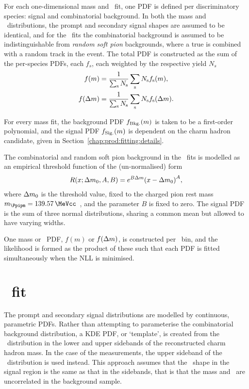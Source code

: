 For each one-dimensional mass and \deltam\ fit, one PDF is defined per 
discriminatory species: signal and combinatorial background.
In both the mass and \deltam\ distributions, the prompt and secondary signal 
shapes are assumed to be identical, and for the \deltam\ fits the combinatorial 
background is assumed to be indistinguishable from \emph{random soft pion} 
backgrounds, where a true \PDzero is combined with a random track in the event.
The total \ac{PDF} is constructed as the sum of the per-species \acp{PDF}, each $f_{s}$, 
each weighted by the respective yield $N_{s}$
\begin{align}
  f(m) &= \frac{1}{\sum_{\textnormal{s}} N_{\textnormal{s}}}
          \sum_{\textnormal{s}} N_{\textnormal{s}}
          f_{\textnormal{s}}(m),\\
  f(\Delta{m}) &= \frac{1}{\sum_{\textnormal{s}} N_{\textnormal{s}}}
                \sum_{\textnormal{s}} N_{\textnormal{s}}
                f_{\textnormal{s}}(\Delta{m}).
\end{align}

For every mass fit, the background PDF $f_{\textnormal{Bkg.}}(m)$ is taken to 
be a first-order polynomial, and the signal PDF $f_{\textnormal{Sig.}}(m)$ is 
dependent on the charm hadron candidate, given in 
Section~\ref{chap:prod:fitting:details}.

The combinatorial and random soft pion background in the \deltam\ fits is 
modelled as an empirical threshold function of the (un-normalised) form
\begin{equation}
  R(x; \Delta{m}_{0}, A, B) = e^{B\Delta{m}}
    {(x - \Delta{m}_{0})}^A,
\end{equation}
where $\Delta{m}_{0}$ is the threshold value, fixed to the charged pion rest mass 
$m_{\Ppipm} = \SI{139.57}{\MeVcc}$~\cite{PDG2014}, and the parameter $B$ is 
fixed to zero.
The signal PDF is the sum of three normal distributions, sharing a common mean 
but allowed to have varying widths.

One mass or \deltam\ PDF, $f(m)$ or $f(\Delta{m})$, is constructed per \pTy\ bin, 
and the likelihood is formed as the product of these such that each PDF is 
fitted simultaneously when the \ac{NLL} is minimised.

\section{\lnipchisq\ fit}
\label{chap:prod:fitting:ipchisq}

The prompt and secondary signal distributions are modelled by continuous, 
parametric \acp{PDF}.
Rather than attempting to parameterise the combinatorial background 
distribution, a \acf{KDE} \ac{PDF}, or `template', is created from the 
\lnipchisq\ distribution in the lower and upper sidebands of the reconstructed 
charm hadron mass.
In the case of the \PDstarp measurements, the upper sideband of the \deltam\ 
distribution is used instead.
This approach assumes that the \lnipchisq\ shape in the signal region is the 
same as that in the sidebands, that is that the mass and \lnipchisq\ are 
uncorrelated in the background sample.

